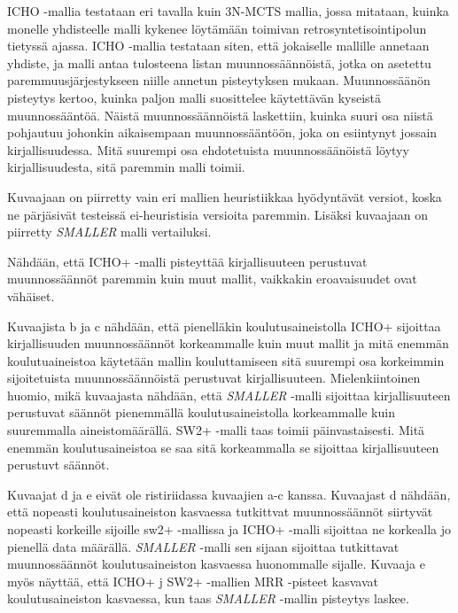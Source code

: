 \documentclass[finnish,twoside,censored,tkt,sw-line]{HYthesisML}
\begin{document}
ICHO -mallia testataan eri tavalla kuin 3N-MCTS mallia, jossa mitataan, kuinka monelle yhdisteelle malli kykenee löytämään toimivan retrosyntetisointipolun tietyssä ajassa.
ICHO -mallia testataan siten, että jokaiselle mallille annetaan yhdiste, ja malli antaa tulosteena listan muunnossäännöistä, jotka on asetettu paremmuusjärjestykseen niille annetun pisteytyksen mukaan.
Muunnossäänön pisteytys kertoo, kuinka paljon malli suosittelee käytettävän kyseistä muunnossääntöä.
Näistä muunnossäännöistä laskettiin, kuinka suuri osa niistä pohjautuu johonkin aikaisempaan muunnossääntöön, joka on esiintynyt jossain kirjallisuudessa.
Mitä suurempi osa ehdotetuista muunnossäänöistä löytyy kirjallisuudesta, sitä paremmin malli toimii.

Kuvaajaan on piirretty vain eri mallien heuristiikkaa hyödyntävät versiot, koska ne pärjäsivät testeissä ei-heuristisia versioita paremmin.
Lisäksi kuvaajaan on piirretty \emph{SMALLER} malli vertailuksi.

Nähdään, että ICHO+ -malli pisteyttää kirjallisuuteen perustuvat muunnossäännöt paremmin kuin muut mallit, vaikkakin eroavaisuudet ovat vähäiset.

Kuvaajista b ja c nähdään, että pienelläkin koulutusaineistolla ICHO+ sijoittaa kirjallisuuden muunnossäännöt korkeammalle kuin muut mallit ja mitä enemmän koulutuaineistoa käytetään mallin kouluttamiseen sitä suurempi osa korkeimmin sijoitetuista muunnossäännöistä perustuvat kirjallisuuteen.
Mielenkiintoinen huomio, mikä kuvaajasta nähdään, että \emph{SMALLER} -malli sijoittaa kirjallisuuteen perustuvat säännöt pienemmällä koulutusaineistolla korkeammalle kuin suuremmalla aineistomäärällä.
SW2+ -malli taas toimii päinvastaisesti.
Mitä enemmän koulutusaineistoa se saa sitä korkeammalla se sijoittaa kirjallisuuteen perustuvt säännöt.

Kuvaajat d ja e eivät ole ristiriidassa kuvaajien a-c kanssa.
Kuvaajast d nähdään, että nopeasti koulutusaineiston kasvaessa tutkittvat muunnossäännöt siirtyvät nopeasti korkeille sijoille sw2+ -mallissa ja ICHO+ -malli sijoittaa ne korkealla jo pienellä data määrällä.
\emph{SMALLER} -malli sen sijaan sijoittaa tutkittavat muunnossäännöt koulutusaineiston kasvaessa huonommalle sijalle.
Kuvaaja e myös näyttää, että ICHO+ j SW2+ -mallien MRR -pisteet kasvavat koulutusaineiston kasvaessa, kun taas \emph{SMALLER} -mallin pisteytys laskee.
\end{document}
